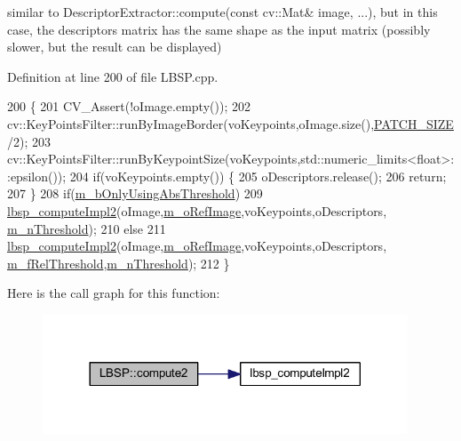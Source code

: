 similar to Descriptor\+Extractor\+::compute(const cv\+::\+Mat\& image, ...), but in this case, the descriptors matrix has the same shape as the input matrix (possibly slower, but the result can be displayed) 



Definition at line 200 of file L\+B\+S\+P.\+cpp.


\begin{DoxyCode}
200                                                                                                       \{
201     CV\_Assert(!oImage.empty());
202     cv::KeyPointsFilter::runByImageBorder(voKeypoints,oImage.size(),\mbox{\hyperlink{class_l_b_s_p_aa98abb79a155d3a2b416c2ab32e74929}{PATCH\_SIZE}}/2);
203     cv::KeyPointsFilter::runByKeypointSize(voKeypoints,std::numeric\_limits<float>::epsilon());
204     \textcolor{keywordflow}{if}(voKeypoints.empty()) \{
205         oDescriptors.release();
206         \textcolor{keywordflow}{return};
207     \}
208     \textcolor{keywordflow}{if}(\mbox{\hyperlink{class_l_b_s_p_a5f49537c70502b73f32038218a4f8371}{m\_bOnlyUsingAbsThreshold}})
209         \mbox{\hyperlink{_l_b_s_p_8cpp_ae3b8f6aa03bfa7f16d458a8347dba320}{lbsp\_computeImpl2}}(oImage,\mbox{\hyperlink{class_l_b_s_p_a8c5ccb37124c8fa457db0ba9dbe28c18}{m\_oRefImage}},voKeypoints,oDescriptors,
      \mbox{\hyperlink{class_l_b_s_p_aa1c90eb308a5ff277df09c4da186693a}{m\_nThreshold}});
210     \textcolor{keywordflow}{else}
211         \mbox{\hyperlink{_l_b_s_p_8cpp_ae3b8f6aa03bfa7f16d458a8347dba320}{lbsp\_computeImpl2}}(oImage,\mbox{\hyperlink{class_l_b_s_p_a8c5ccb37124c8fa457db0ba9dbe28c18}{m\_oRefImage}},voKeypoints,oDescriptors,
      \mbox{\hyperlink{class_l_b_s_p_a99fbb83c842782bb5621a43efb7580d5}{m\_fRelThreshold}},\mbox{\hyperlink{class_l_b_s_p_aa1c90eb308a5ff277df09c4da186693a}{m\_nThreshold}});
212 \}
\end{DoxyCode}
Here is the call graph for this function\+:\nopagebreak
\begin{figure}[H]
\begin{center}
\leavevmode
\includegraphics[width=308pt]{class_l_b_s_p_ab61148341758dbc004660761bca04f84_cgraph}
\end{center}
\end{figure}

